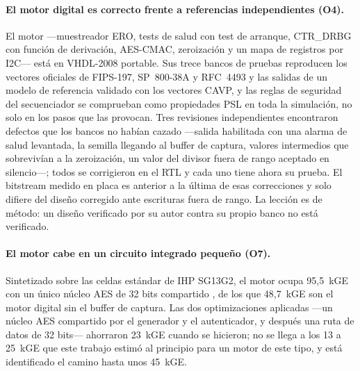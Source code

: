 \paragraph{El motor digital es correcto frente a referencias
independientes (O4).} El motor ---muestreador \ac{ERO}, tests de salud
con test de arranque, CTR\_DRBG con función de derivación, AES-CMAC,
zeroización y un mapa de registros por I2C--- está en VHDL-2008 portable.
Sus trece bancos de pruebas reproducen los vectores oficiales de
FIPS-197, SP~800-38A y RFC~4493 y las salidas de un modelo de referencia
validado con los vectores \ac{CAVP}, y las reglas de seguridad del
secuenciador se comprueban como propiedades \ac{PSL} en toda la
simulación, no solo en los pasos que las provocan. Tres revisiones
independientes encontraron defectos que los bancos no habían cazado
---salida habilitada con una alarma de salud levantada, la semilla
llegando al buffer de captura, valores intermedios que sobrevivían a la
zeroización, un valor del divisor fuera de rango aceptado en silencio---;
todos se corrigieron en el \ac{RTL} y cada uno tiene ahora su prueba. El
bitstream medido en placa es anterior a la última de esas correcciones y
solo difiere del diseño corregido ante escrituras fuera de rango. La
lección es de método: un diseño verificado por su autor contra su propio
banco no está verificado.

\paragraph{El motor cabe en un circuito integrado pequeño (O7).}
Sintetizado sobre las celdas estándar de IHP SG13G2, el motor ocupa
95,5~kGE con un único núcleo AES de 32 bits compartido \simu{}, de los que
48,7~kGE son el motor digital sin el buffer de captura. Las dos
optimizaciones aplicadas ---un núcleo AES compartido por el generador y el
autenticador, y después una ruta de datos de 32 bits--- ahorraron
23~kGE cuando se hicieron; no se llega a los 13 a 25~kGE que este trabajo
estimó al principio para un motor de este tipo, y está identificado el
camino hasta unos 45~kGE.

